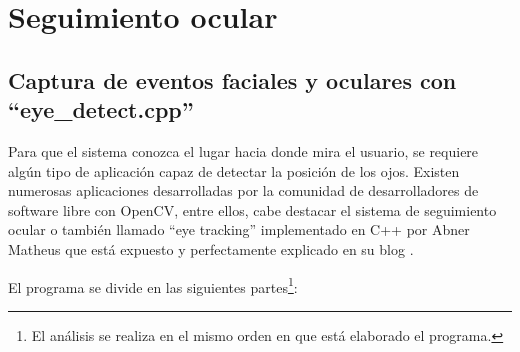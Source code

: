 \newpage
\section{Seguimiento ocular} \label{s3_2}

\subsection{Captura de eventos faciales y oculares con ``eye\_detect.cpp''} \label{s3_2_1}

Para que el sistema conozca el lugar hacia donde mira el usuario, se requiere algún tipo de aplicación capaz de detectar la posición de los ojos. Existen numerosas aplicaciones desarrolladas por la comunidad de desarrolladores de software libre con OpenCV, entre ellos, cabe destacar el sistema de seguimiento ocular o también llamado ``eye tracking'' implementado en C++ por Abner Matheus que está expuesto y perfectamente explicado en su blog \citep{eyetracking}.

El programa se divide en las siguientes partes\footnote{El análisis se realiza en el mismo orden en que está elaborado el programa.}:

